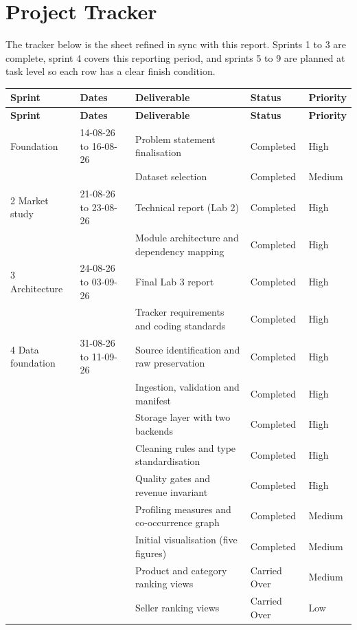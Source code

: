\documentclass[11pt,a4paper]{article}
\begin{document}
\clearpage
\appendix
\section{Project Tracker}
The tracker below is the sheet refined in sync with this report. Sprints 1 to 3 are complete,
sprint 4 covers this reporting period, and sprints 5 to 9 are planned at task level so each row
has a clear finish condition.

\begin{longtable}{@{}p{2.5cm}p{2.5cm}p{6.4cm}p{2.0cm}p{1.6cm}@{}}
\toprule
\textbf{Sprint} & \textbf{Dates} & \textbf{Deliverable} & \textbf{Status} & \textbf{Priority} \\
\midrule
\endfirsthead
\toprule
\textbf{Sprint} & \textbf{Dates} & \textbf{Deliverable} & \textbf{Status} & \textbf{Priority} \\
\midrule
\endhead
\bottomrule
\endfoot
1 Foundation & 14-08-26 to 16-08-26 & Problem statement finalisation & Completed & High \\
 & & Dataset selection & Completed & Medium \\
2 Market study & 21-08-26 to 23-08-26 & Technical report (Lab 2) & Completed & High \\
 & & Module architecture and dependency mapping & Completed & High \\
3 Architecture & 24-08-26 to 03-09-26 & Final Lab 3 report & Completed & High \\
 & & Tracker requirements and coding standards & Completed & High \\
4 Data foundation & 31-08-26 to 11-09-26 & Source identification and raw preservation & Completed & High \\
 & & Ingestion, validation and manifest & Completed & High \\
 & & Storage layer with two backends & Completed & High \\
 & & Cleaning rules and type standardisation & Completed & High \\
 & & Quality gates and revenue invariant & Completed & High \\
 & & Profiling measures and co-occurrence graph & Completed & Medium \\
 & & Initial visualisation (five figures) & Completed & Medium \\
 & & Product and category ranking views & Carried Over & Medium \\
 & & Seller ranking views & Carried Over & Low \\

\end{longtable}
\end{document}
